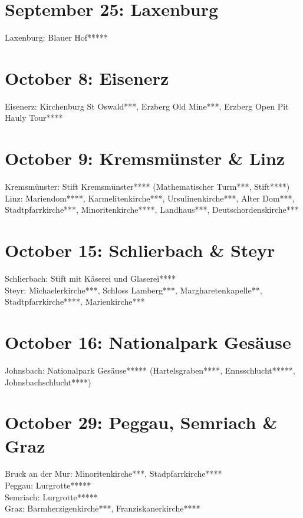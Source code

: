 \section{September 25: Laxenburg}
\label{2022:Laxenburg}

Laxenburg: Blauer Hof*****\\

\section{October 8: Eisenerz}
\label{2022:Eisenerz}

Eisenerz: Kirchenburg St Oswald***, Erzberg Old Mine***, Erzberg Open Pit Hauly Tour****\\

\section{October 9: Kremsm\"unster \& Linz}
\label{2022:Kremsmuenster}

Kremsm\"unster: Stift Kremsm\"unster**** (Mathematischer Turm***, Stift****)\\
Linz: Mariendom****, Karmelitenkirche***, Ursulinenkirche***, Alter Dom***, Stadtpfarrkirche***, Minoritenkirche****, Landhaus***, Deutschordenskirche***

\section{October 15: Schlierbach \& Steyr}
\label{2022:Schlierbach}

Schlierbach: Stift mit K\"aserei und Glaserei****\\
Steyr: Michaelerkirche***, Schloss Lamberg***, Margharetenkapelle**, Stadtpfarrkirche****, Marienkirche***\\

\section{October 16: Nationalpark Ges\"ause}
\label{2022:Gesaeuse}

Johnsbach: Nationalpark Ges\"ause***** (Hartelsgraben****, Ennsschlucht*****, Johnsbachschlucht****)

\section{October 29: Peggau, Semriach \& Graz}
\label{2022:Lurgrotte}

Bruck an der Mur: Minoritenkirche***, Stadpfarrkirche****\\
Peggau: Lurgrotte*****\\
Semriach: Lurgrotte*****\\
Graz: Barmherzigenkirche***, Franziskanerkirche****

